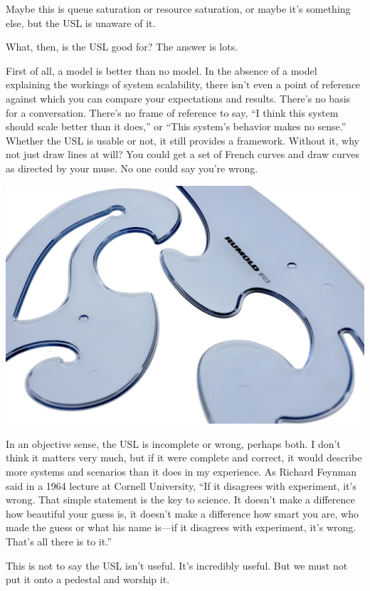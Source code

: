 \documentclass{vivid_layout}
\begin{document}
Maybe this is queue saturation or resource saturation, or maybe it's something
else, but the USL is unaware of it.

What, then, is the USL good for? The answer is lots.

First of all, a model is better than no model. In the absence of a model
explaining the workings of system scalability, there isn't even a point of
reference against which you can compare your expectations and results. There's
no basis for a conversation. There's no frame of reference to say, ``I think
this system should scale better than it does,'' or ``This system's behavior
makes no sense.'' Whether the USL is usable or not, it still provides a
framework. Without it, why not just draw lines at will? You
could get a set of French curves and draw curves as directed by your muse. No
one could say you're wrong.
\begin{center}
\includegraphics[width=.85\linewidth,trim={0 8cm 0 0},clip]{scalability/french_curve}
\end{center}

In an objective sense, the USL is incomplete or wrong, perhaps both. I don't
think it matters very much, but if it were complete and correct, it would
describe more systems and scenarios than it does in my experience. As Richard
Feynman said in a 1964 lecture at Cornell University, ``If it disagrees with
experiment, it’s wrong.  That simple statement is the key to science. It
doesn’t make a difference how beautiful your guess is, it doesn’t make a
difference how smart you are, who made the guess or what his name is---if it
disagrees with experiment, it’s wrong. That’s all there is to it.''

This is not to say the USL isn't useful. It's incredibly useful. But we must not
put it onto a pedestal and worship it.
\end{document}
